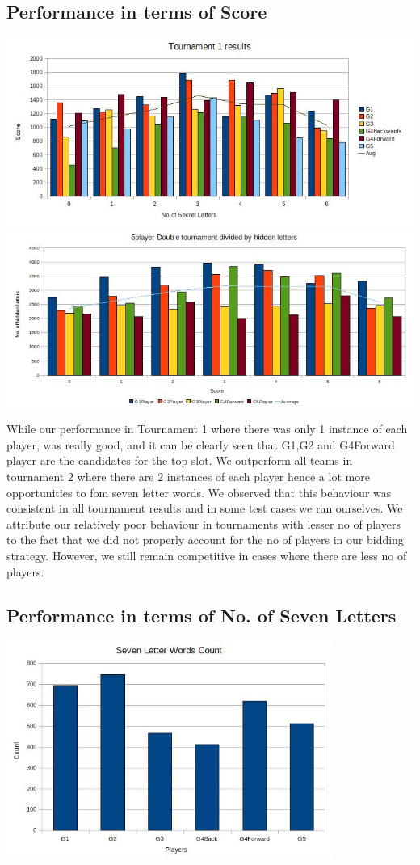 \documentclass[11pt]{article}
\begin{document}
	\subsection{Performance in terms of Score}
	
	\includegraphics[width=1\textwidth]{T1Results}
	\includegraphics[width=1\textwidth]{T2Results}
	
	While our performance in Tournament 1 where there was only 1 instance of each player, was really good, and it can be clearly seen that G1,G2 and G4Forward player are the candidates for the top slot. We outperform all teams in tournament 2 where there are 2 instances of each player hence a lot more opportunities to fom seven letter words. We observed that this behaviour was consistent in all tournament results and in some test cases we ran ourselves. We attribute our relatively poor behaviour in tournaments with lesser no of players to the fact that we did not properly account for the no of players in our bidding strategy. However, we still remain competitive in cases where there are less no of players.
	
	\subsection{Performance in terms of No. of Seven Letters}
	
	\includegraphics[width=0.8\textwidth]{SevenCount}
	
\end{document}
